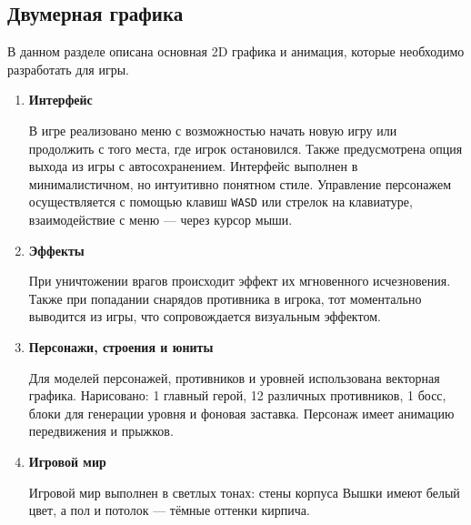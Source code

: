 \documentclass{article}
\begin{document}
\subsection*{Двумерная графика}
В данном разделе описана основная 2D графика и анимация, которые необходимо разработать для игры.
\begin{enumerate}
  \item \textbf{Интерфейс} \par
  В игре реализовано меню с возможностью начать новую игру или продолжить с того места, где игрок остановился. Также предусмотрена опция выхода из игры с автосохранением. Интерфейс выполнен в минималистичном, но интуитивно понятном стиле. Управление персонажем осуществляется с помощью клавиш \texttt{WASD} или стрелок на клавиатуре, взаимодействие с меню — через курсор мыши.
  \item \textbf{Эффекты} \par
  При уничтожении врагов происходит эффект их мгновенного исчезновения. Также при попадании снарядов противника в игрока, тот моментально выводится из игры, что сопровождается визуальным эффектом.
  \item \textbf{Персонажи, строения и юниты} \par
  Для моделей персонажей, противников и уровней использована векторная графика. Нарисовано: 1 главный герой, 12 различных противников, 1 босс, блоки для генерации уровня и фоновая заставка. Персонаж имеет анимацию передвижения и прыжков.
  \item \textbf{Игровой мир} \par
  Игровой мир выполнен в светлых тонах: стены корпуса Вышки имеют белый цвет, а пол и потолок — тёмные оттенки кирпича.
\end{enumerate}
\end{document}

